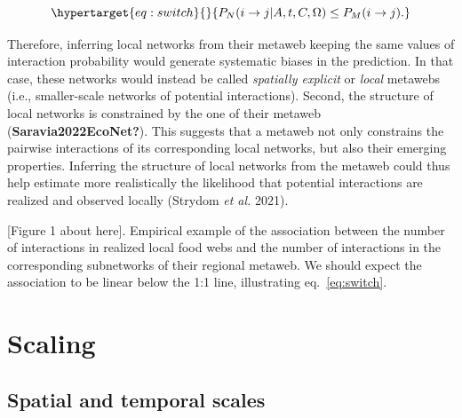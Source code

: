 \documentclass[10pt,oneside]{article}
\begin{document}
\begin{equation}\protect\hypertarget{eq:switch}{}{P_{N}(i \rightarrow j | A, t, C, \Omega) \le
P_M(i \rightarrow j).}\label{eq:switch}\end{equation}

Therefore, inferring local networks from their metaweb keeping the same
values of interaction probability would generate systematic biases in
the prediction. In that case, these networks would instead be called
\emph{spatially explicit} or \emph{local} metawebs (i.e., smaller-scale
networks of potential interactions). Second, the structure of local
networks is constrained by the one of their metaweb
(\textbf{Saravia2022EcoNet?}). This suggests that a metaweb not only
constrains the pairwise interactions of its corresponding local
networks, but also their emerging properties. Inferring the structure of
local networks from the metaweb could thus help estimate more
realistically the likelihood that potential interactions are realized
and observed locally (Strydom \emph{et al.} 2021).

{[}Figure 1 about here{]}. Empirical example of the association between
the number of interactions in realized local food webs and the number of
interactions in the corresponding subnetworks of their regional metaweb.
We should expect the association to be linear below the 1:1 line,
illustrating eq.~\ref{eq:switch}.

\hypertarget{scaling}{%
\section{Scaling}\label{scaling}}

\hypertarget{spatial-and-temporal-scales}{%
\subsection{Spatial and temporal
scales}\label{spatial-and-temporal-scales}}
\end{document}
